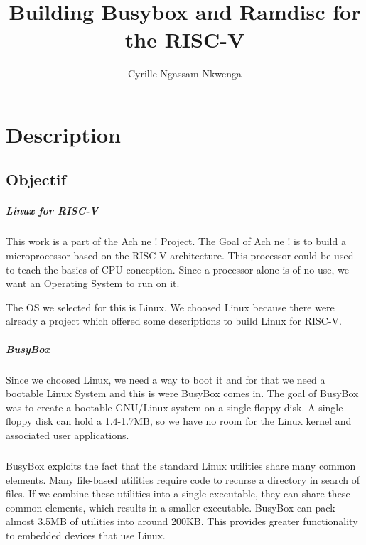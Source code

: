 \documentclass[a4paper,11pt]{report}
\title{Building Busybox and Ramdisc for the RISC-V }
\author{Cyrille Ngassam Nkwenga}
\begin{document}
\maketitle
\tableofcontents

\begin{abstract}
\end{abstract}

\chapter{Description}
\section{Objectif}
\paragraph{Linux for RISC-V}
This work is a part of the Ach ne ! Project. The Goal of Ach ne ! is
to build a microprocessor based on the RISC-V architecture. This processor could be
used to teach the basics of CPU conception.
Since a processor alone is of no use, we want an Operating System to run on it.

The OS we selected for this is Linux. We choosed Linux because there were already
a project which offered some descriptions to build Linux for RISC-V.


\paragraph{BusyBox}
Since we choosed Linux, we need a way to boot it and for that we need
a bootable Linux System and this is were BusyBox comes in.
The goal of BusyBox was to create a bootable GNU/Linux system on a single 
floppy disk. A single floppy disk can hold a 1.4-1.7MB, so we have no room 
for the Linux kernel and associated user applications.

\paragraph{}
BusyBox exploits the fact that the standard Linux utilities share many common
elements. Many file-based utilities require code to recurse a directory in 
search of files. If we combine these utilities into a single executable, they
can share these common elements, which results in a smaller executable.
BusyBox can pack almost 3.5MB of utilities into around 200KB. This provides greater
functionality to embedded devices that use Linux.
\end{document}
